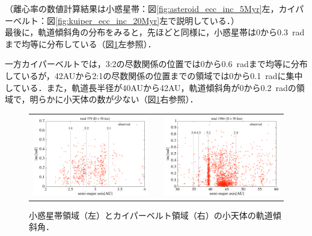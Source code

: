 \documentclass[11pt,a4paper,oneside,onecolumn]{jreport}
\begin{document}
（離心率の数値計算結果は小惑星帯：図\ref{fig:asteroid_ecc_inc_5Myr}左，カイパーベルト：図\ref{fig:kuiper_ecc_inc_20Myr}左で説明している．）
\\

最後に，軌道傾斜角の分布をみると，先ほどと同様に，小惑星帯は0から0.3\ radまで均等に分布している（図\ref{fig:obs_inc}左参照）．

一方カイパーベルトでは，3:2の尽数関係の位置では0から0.6\ radまで均等に分布しているが，42AUから2:1の尽数関係の位置までの領域では0から0.1\ radに集中している．また，軌道長半径が40AUから42AU，軌道傾斜角が0から0.2\ radの領域で，明らかに小天体の数が少ない（図\ref{fig:obs_inc}右参照）．

\begin{figure}[H]
\begin{tabular}{ccc}
\begin{minipage}[t]{0.45\hsize}
\centering
\includegraphics[width=8cm]{./image/mainbelt_inc.pdf}
\end{minipage} &
\begin{minipage}[t]{0.1\hsize}
\end{minipage} &
\begin{minipage}[t]{0.45\hsize}
\centering
\includegraphics[width=8cm]{./image/kuiperbelt_inc.pdf}
\end{minipage}\\
%
\end{tabular}
\caption{小惑星帯領域（左）とカイパーベルト領域（右）の小天体の軌道傾斜角．\label{fig:obs_inc}}
\end{figure}
\end{document}
